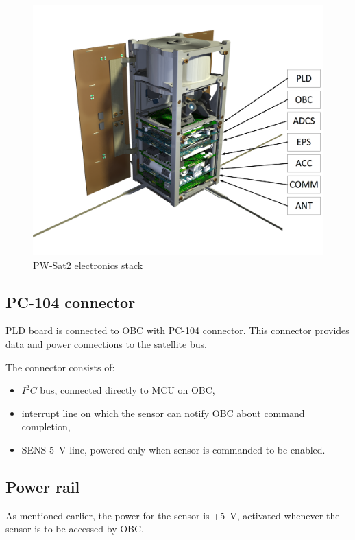         \begin{figure}[H]
            \centering
            \includegraphics[width=0.5\paperwidth]{img/04/PW-Sat2-stack.png}
            \caption{PW-Sat2 electronics stack}
            \label{PW-Sat2_stack}
        \end{figure}

    \subsection{PC-104 connector}
        PLD board is connected to OBC with PC-104 connector. This connector provides data and power connections to the satellite bus.

        The connector consists of:
        \begin{itemize}
            \item $I^2C$ bus, connected directly to MCU on OBC,
            \item interrupt line on which the sensor can notify OBC about command completion,
            \item SENS \SI{5}{\volt} line, powered only when sensor is commanded to be enabled.
        \end{itemize}

    \subsection{Power rail}
        As mentioned earlier, the power for the sensor is +\SI{5}{\volt}, activated whenever the sensor is to be accessed by OBC.

